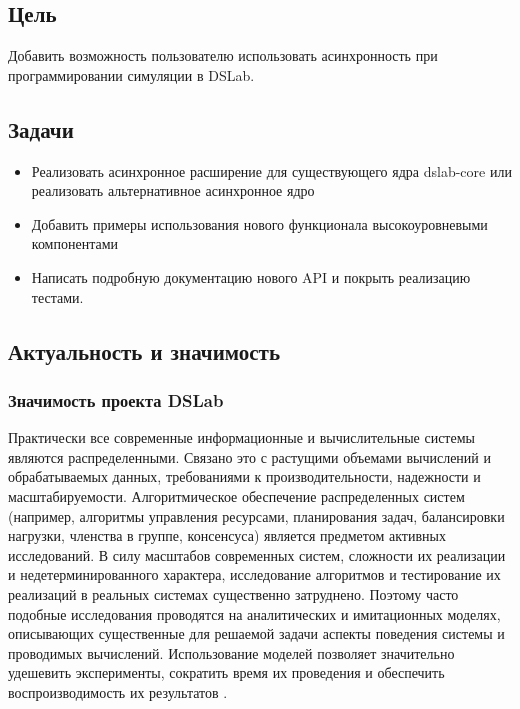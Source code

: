 \subsection{Цель}

Добавить возможность пользователю использовать асинхронность при программировании симуляции в DSLab.

\subsection{Задачи}
\begin{itemize}
    \item Реализовать асинхронное расширение для существующего ядра dslab-core или реализовать альтернативное асинхронное ядро 
    \item Добавить примеры использования нового функционала высокоуровневыми компонентами
    \item Написать подробную документацию нового API и покрыть реализацию тестами.
\end{itemize}


\subsection{Актуальность и значимость}

\subsubsection{Значимость проекта DSLab}

Практически все современные информационные и вычислительные системы являются распределенными. Связано это с растущими объемами вычислений и обрабатываемых данных, требованиями к производительности, надежности и масштабируемости. Алгоритмическое обеспечение распределенных систем (например, алгоритмы управления ресурсами, планирования задач, балансировки нагрузки, членства в группе, консенсуса) является предметом активных исследований. В силу масштабов современных систем, сложности их реализации и недетерминированного характера, исследование алгоритмов и тестирование их реализаций в реальных системах существенно затруднено. Поэтому часто подобные исследования проводятся на аналитических и имитационных моделях, описывающих существенные для решаемой задачи аспекты поведения системы и проводимых вычислений. Использование моделей позволяет значительно удешевить эксперименты, сократить время их проведения и обеспечить воспроизводимость их результатов \cite{dslab-description}. 

